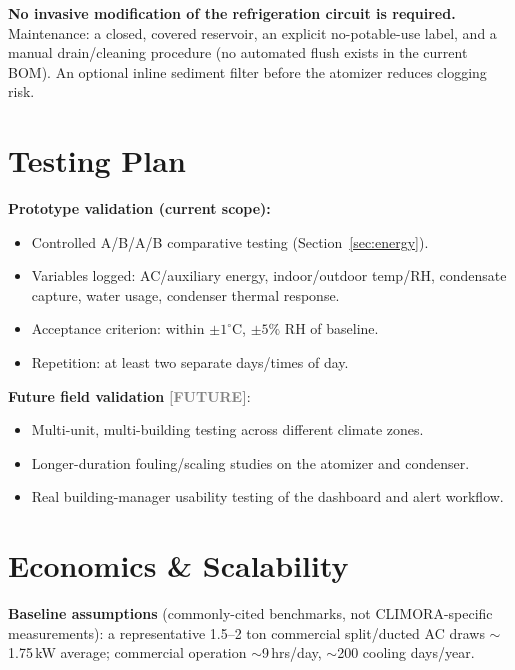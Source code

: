\documentclass[11pt,a4paper]{article}
\newcommand{\future}{\textcolor{gray}{\textbf{[FUTURE]}}}
\begin{document}
\textbf{No invasive modification of the refrigeration circuit is required.} Maintenance: a closed, covered reservoir, an explicit no-potable-use label, and a manual drain/cleaning procedure (no automated flush exists in the current BOM). An optional inline sediment filter before the atomizer reduces clogging risk.

\section{Testing Plan}

\textbf{Prototype validation (current scope):}
\begin{itemize}[nosep]
    \item Controlled A/B/A/B comparative testing (Section~\ref{sec:energy}).
    \item Variables logged: AC/auxiliary energy, indoor/outdoor temp/RH, condensate capture, water usage, condenser thermal response.
    \item Acceptance criterion: within $\pm1^\circ$C, $\pm5\%$ RH of baseline.
    \item Repetition: at least two separate days/times of day.
\end{itemize}

\textbf{Future field validation} \future:
\begin{itemize}[nosep]
    \item Multi-unit, multi-building testing across different climate zones.
    \item Longer-duration fouling/scaling studies on the atomizer and condenser.
    \item Real building-manager usability testing of the dashboard and alert workflow.
\end{itemize}

\section{Economics \& Scalability}

\textbf{Baseline assumptions} (commonly-cited benchmarks, not CLIMORA-specific measurements): a representative 1.5--2 ton commercial split/ducted AC draws $\sim$1.75\,kW average; commercial operation $\sim$9\,hrs/day, $\sim$200 cooling days/year.
\end{document}
